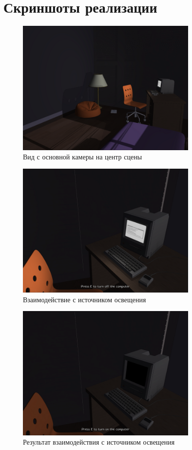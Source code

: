\documentclass[listings]{labreport}
\begin{document}
\section*{Скриншоты реализации}

\begin{figure}[h!]
\centering
\includegraphics[width=0.8\textwidth]{screenshots/scene.png}
\caption{Вид с основной камеры на центр сцены}
\end{figure}

\begin{figure}[h!]
\centering
\includegraphics[width=0.8\textwidth]{screenshots/computer-interaction-on.png}
\caption{Взаимодействие с источником освещения}
\end{figure}

\begin{figure}[h!]
\centering
\includegraphics[width=0.8\textwidth]{screenshots/computer-interaction-off.png}
\caption{Результат взаимодействия с источником освещения}
\end{figure}
\end{document}
